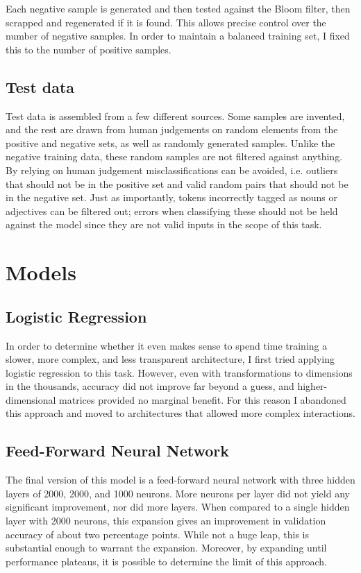 \documentclass[a4paper, 11pt]{scrartcl}
\begin{document}
Each negative sample is generated and then tested against the Bloom filter, then scrapped and regenerated if it is found. This allows precise control over the number of negative samples. In order to maintain a balanced training set, I fixed this to the number of positive samples.

\subsection{Test data}

Test data is assembled from a few different sources. Some samples are invented, and the rest are drawn from human judgements on random elements from the positive and negative sets, as well as randomly generated samples. Unlike the negative training data, these random samples are not filtered against anything. By relying on human judgement misclassifications can be avoided, i.e. outliers that should not be in the positive set and valid random pairs that should not be in the negative set. Just as importantly, tokens incorrectly tagged as nouns or adjectives can be filtered out; errors when classifying these should not be held against the model since they are not valid inputs in the scope of this task.


\section{Models}

\subsection{Logistic Regression}
In order to determine whether it even makes sense to spend time training a slower, more complex, and less transparent architecture, I first tried applying logistic regression to this task. However, even with transformations to dimensions in the thousands, accuracy did not improve far beyond a guess, and higher-dimensional matrices provided no marginal benefit. For this reason I abandoned this approach and moved to architectures that allowed more complex interactions.

\subsection{Feed-Forward Neural Network}
The final version of this model is a feed-forward neural network with three hidden layers of 2000, 2000, and 1000 neurons. More neurons per layer did not yield any significant improvement, nor did more layers. When compared to a single hidden layer with 2000 neurons, this expansion gives an improvement in validation accuracy of about two percentage points. While not a huge leap, this is substantial enough to warrant the expansion. Moreover, by expanding until performance plateaus, it is possible to determine the limit of this approach.
\end{document}

